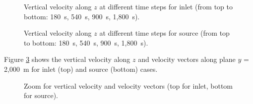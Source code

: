 \begin{figure}[H]
\centering
\begin{minipage}[t]{\textwidth}
 \centering
{}
\end{minipage}
%
\begin{minipage}[t]{\textwidth}
 \centering
{}
\end{minipage}
%
\begin{minipage}[t]{\textwidth}
 \centering
{}
\end{minipage}
%
\begin{minipage}[t]{\textwidth}
 \centering
{}
\end{minipage}
%
 \caption{Vertical velocity along $z$ at different time steps for inlet (from top to bottom: 180~s, 540~s, 900~s, 1,800~s).}
 \label{fig:bottom_bc:veloW_inlet}
\end{figure}

\begin{figure}[H]
\centering
\begin{minipage}[t]{\textwidth}
 \centering
{}
\end{minipage}
%
\begin{minipage}[t]{\textwidth}
 \centering
{}
\end{minipage}
%
\begin{minipage}[t]{\textwidth}
 \centering
{}
\end{minipage}
%
\begin{minipage}[t]{\textwidth}
 \centering
{}
\end{minipage}
%
 \caption{Vertical velocity along $z$ at different time steps for source (from top to bottom: 180~s, 540~s, 900~s, 1,800~s).}
 \label{fig:bottom_bc:veloW_source}
\end{figure}

Figure \ref{fig:bottom_bc:vectorial} shows the vertical velocity along $z$
and velocity vectors along plane $y$ = 2,000~m
for inlet (top) and source (bottom) cases.

\begin{figure}[H]
\centering
\begin{minipage}[t]{\textwidth}
 \centering
{}
\end{minipage}
%
\begin{minipage}[t]{\textwidth}
 \centering
{}
\end{minipage}
%
 \caption{Zoom for vertical velocity and velocity vectors (top for inlet, bottom for source).}
 \label{fig:bottom_bc:vectorial}
\end{figure}

